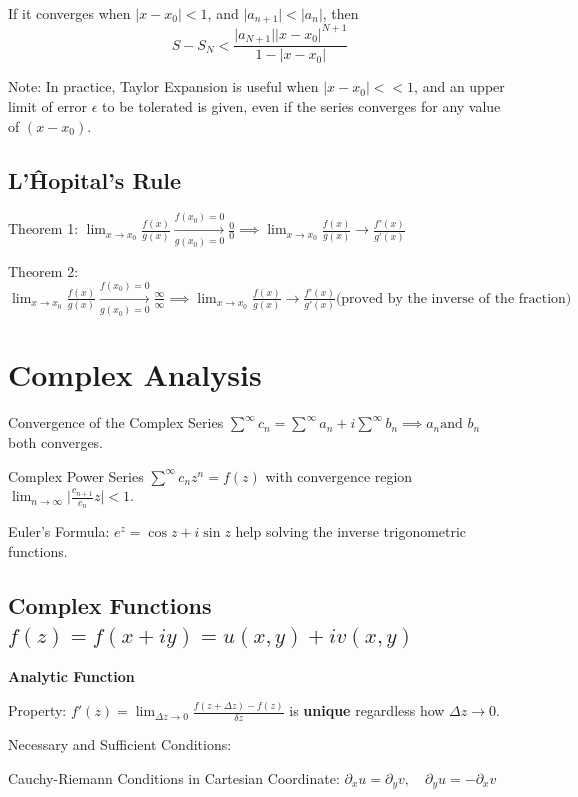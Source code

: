 \documentclass[10pt]{article}
\begin{document}
If it converges when $\big|x-x_0\big| < 1$, and $\big|a_{n+1}\big| < \big|a_n\big|$, then
$$
S - S_N < \frac{\big|a_{N+1}\big| \big|x-x_0\big|^{N+1}}{1-\big|x-x_0\big|}
$$

Note: In practice, Taylor Expansion is useful when $\big|x-x_0\big| << 1$, and an upper limit of error $\epsilon$ to be tolerated is given, even if the series converges for any value of $(x-x_0)$.

\subsection{L'Ĥopital's Rule}

Theorem 1:
$
\lim_{x\to x_0} \frac{f(x)}{g(x)} \overset{f(x_0)=0}{\underset{g(x_0)=0}\longrightarrow} \frac{0}{0}  \implies \lim_{x\to x_0} \frac{f(x)}{g(x)} \longrightarrow \frac{f'(x)}{g'(x)}
$

Theorem 2:
$
\lim_{x\to x_0} \frac{f(x)}{g(x)} \overset{f(x_0)=0}{\underset{g(x_0)=0}\longrightarrow} \frac{\infty}{\infty}  \implies \lim_{x\to x_0} \frac{f(x)}{g(x)} \longrightarrow \frac{f'(x)}{g'(x)} \text{(proved by the inverse of the fraction)}
$

\section{Complex Analysis}

Convergence of the Complex Series $\sum^\infty c_n = \sum^\infty a_n + i\sum^\infty b_n \implies a_n \text{and } b_n$ both converges.

Complex Power Series $\sum^\infty c_n z^n = f(z)$ with convergence region $\lim_{n\to\infty} \big|\frac{c_{n+1}}{c_n} z\big| < 1$.

Euler's Formula: $e^z = \cos z + i\sin z$ help solving the inverse trigonometric functions.

\subsection[Complex Functions]{Complex Functions $f(z) = f(x + iy) = u(x, y) + iv(x, y)$}

\textbf{Analytic Function}

Property: $f'(z) = \lim_{\Delta z \to 0} \frac{f(z+\Delta z) - f(z)}{\delta z}$ is \textbf{unique} regardless how $\Delta z \to 0$.

Necessary and Sufficient Conditions:

Cauchy-Riemann Conditions in Cartesian Coordinate: $\partial_x u = \partial_y v,\quad \partial_y u = -\partial_x v$
\end{document}
